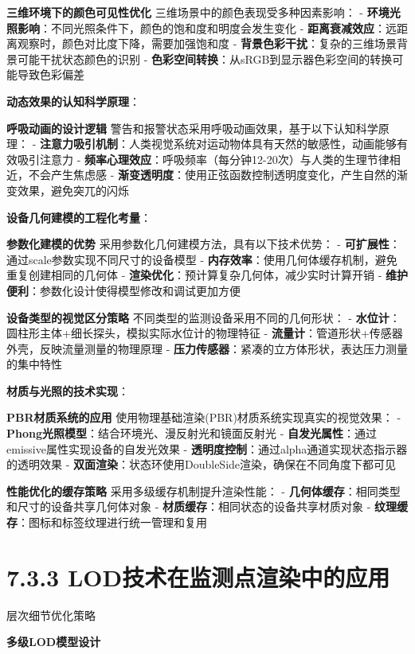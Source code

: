 \textbf{三维环境下的颜色可见性优化} 三维场景中的颜色表现受多种因素影响： - \textbf{环境光照影响}：不同光照条件下，颜色的饱和度和明度会发生变化 - \textbf{距离衰减效应}：远距离观察时，颜色对比度下降，需要加强饱和度 - \textbf{背景色彩干扰}：复杂的三维场景背景可能干扰状态颜色的识别 - \textbf{色彩空间转换}：从sRGB到显示器色彩空间的转换可能导致色彩偏差

\textbf{动态效果的认知科学原理}：

\textbf{呼吸动画的设计逻辑} 警告和报警状态采用呼吸动画效果，基于以下认知科学原理： - \textbf{注意力吸引机制}：人类视觉系统对运动物体具有天然的敏感性，动画能够有效吸引注意力 - \textbf{频率心理效应}：呼吸频率（每分钟12-20次）与人类的生理节律相近，不会产生焦虑感 - \textbf{渐变透明度}：使用正弦函数控制透明度变化，产生自然的渐变效果，避免突兀的闪烁

\textbf{设备几何建模的工程化考量}：

\textbf{参数化建模的优势} 采用参数化几何建模方法，具有以下技术优势： - \textbf{可扩展性}：通过scale参数实现不同尺寸的设备模型 - \textbf{内存效率}：使用几何体缓存机制，避免重复创建相同的几何体 - \textbf{渲染优化}：预计算复杂几何体，减少实时计算开销 - \textbf{维护便利}：参数化设计使得模型修改和调试更加方便

\textbf{设备类型的视觉区分策略} 不同类型的监测设备采用不同的几何形状： - \textbf{水位计}：圆柱形主体+细长探头，模拟实际水位计的物理特征 - \textbf{流量计}：管道形状+传感器外壳，反映流量测量的物理原理 - \textbf{压力传感器}：紧凑的立方体形状，表达压力测量的集中特性

\textbf{材质与光照的技术实现}：

\textbf{PBR材质系统的应用} 使用物理基础渲染(PBR)材质系统实现真实的视觉效果： - \textbf{Phong光照模型}：结合环境光、漫反射光和镜面反射光 - \textbf{自发光属性}：通过emissive属性实现设备的自发光效果 - \textbf{透明度控制}：通过alpha通道实现状态指示器的透明效果 - \textbf{双面渲染}：状态环使用DoubleSide渲染，确保在不同角度下都可见

\textbf{性能优化的缓存策略} 采用多级缓存机制提升渲染性能： - \textbf{几何体缓存}：相同类型和尺寸的设备共享几何体对象 - \textbf{材质缓存}：相同状态的设备共享材质对象 - \textbf{纹理缓存}：图标和标签纹理进行统一管理和复用

\section{7.3.3 LOD技术在监测点渲染中的应用}

 层次细节优化策略

\textbf{多级LOD模型设计}

